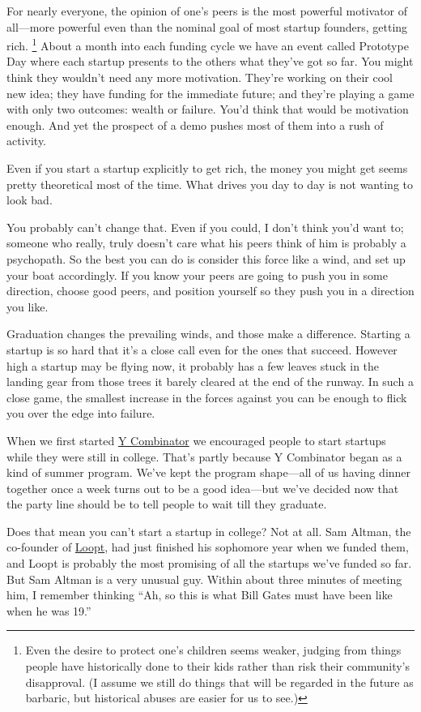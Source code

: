 For nearly everyone, the opinion of one's peers is the most powerful
motivator of all---more powerful even than the nominal goal of most
startup founders, getting rich. \footnote{Even the desire to protect one's children seems weaker, judging
from things people have historically done to their kids rather than risk
their community's disapproval. (I assume we still do things that will be
regarded in the future as barbaric, but historical abuses are easier for
us to see.)} About a month
into each funding cycle we have an event called Prototype Day where each
startup presents to the others what they've got so far. You might think
they wouldn't need any more motivation. They're working on their cool
new idea; they have funding for the immediate future; and they're
playing a game with only two outcomes: wealth or failure. You'd think
that would be motivation enough. And yet the prospect of a demo pushes
most of them into a rush of activity.

Even if you start a startup explicitly to get rich, the money you might
get seems pretty theoretical most of the time. What drives you day to
day is not wanting to look bad.

You probably can't change that. Even if you could, I don't think you'd
want to; someone who really, truly doesn't care what his peers think of
him is probably a psychopath. So the best you can do is consider this
force like a wind, and set up your boat accordingly. If you know your
peers are going to push you in some direction, choose good peers, and
position yourself so they push you in a direction you like.

Graduation changes the prevailing winds, and those make a difference.
Starting a startup is so hard that it's a close call even for the ones
that succeed. However high a startup may be flying now, it probably has
a few leaves stuck in the landing gear from those trees it barely
cleared at the end of the runway. In such a close game, the smallest
increase in the forces against you can be enough to flick you over the
edge into failure.

When we first started \href{http://ycombinator.com}{Y Combinator} we
encouraged people to start startups while they were still in college.
That's partly because Y Combinator began as a kind of summer program.
We've kept the program shape---all of us having dinner together once a
week turns out to be a good idea---but we've decided now that the party
line should be to tell people to wait till they graduate.

Does that mean you can't start a startup in college? Not at all. Sam
Altman, the co-founder of \href{http://loopt.com}{Loopt}, had just
finished his sophomore year when we funded them, and Loopt is probably
the most promising of all the startups we've funded so far. But Sam
Altman is a very unusual guy. Within about three minutes of meeting him,
I remember thinking ``Ah, so this is what Bill Gates must have been like
when he was 19.''

